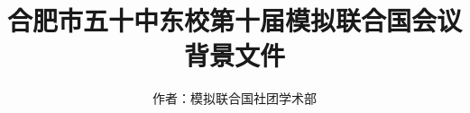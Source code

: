 \documentclass{article}
\title{合肥市五十中东校第十届模拟联合国会议\\\huge 背景文件}
\author{作者：模拟联合国社团学术部}
\begin{document}
    \centering
    \maketitle
    \clearpage
    \tableofcontents
\end{document}

